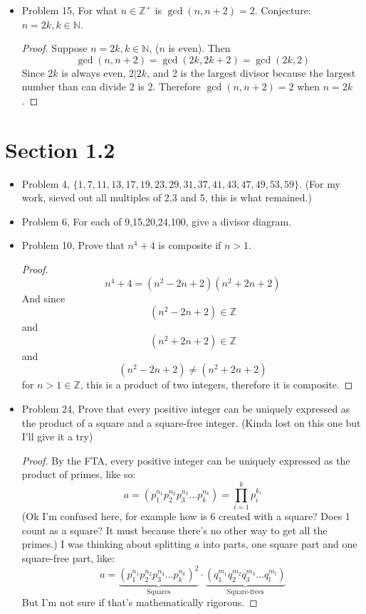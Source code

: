 \documentclass[hidelinks,12pt]{article}
\newcommand{\N}{\mathbb{N}}
\newcommand{\Z}{\mathbb{Z}}
\begin{document}
\begin{itemize}
\begin{proof}
If $n|a$ and $n|b$, then $a=np$, and $b=nq$. Then $a+b+c=np+nq+c=0$. So $c=-n(p+q)$, therefore $c$ is some multiple of $n$, thus $n|c$.
\end{proof}
\item Problem 15, For what $n\in\Z^+$ is $\gcd(n,n+2)=2$. Conjecture: $n=2k,k\in\N$.
\begin{proof}
Suppose $n=2k,k\in\N$, ($n$ is even). Then $$\gcd(n,n+2)=\gcd(2k,2k+2)=\gcd(2k,2)$$Since $2k$ is always even, $2|2k$, and 2 is the largest divisor because the largest number than can divide 2 is 2. Therefore $\gcd(n,n+2)=2$ when $n=2k$.
\end{proof}
\end{itemize}
\section{Section 1.2}
\begin{itemize}
    \item Problem 4, $\{1,7,11,13,17,19,23,29,31,37,41,43,47,49,53,59\}$. (For my work, sieved out all multiples of 2,3 and 5, this is what remained.)
    \item Problem 6, For each of 9,15,20,24,100, give a divisor diagram.\newline{}
    \item Problem 10, Prove that $n^4+4$ is composite if $n>1$.\begin{proof}
    $$n^4+4=(n^2-2n+2)(n^2+2n+2)$$And since $$(n^2-2n+2)\in\Z$$and $$(n^2+2n+2)\in\Z$$ and $$(n^2-2n+2)\neq(n^2+2n+2)$$ for $n>1\in\Z$, this is a product of two integers, therefore it is composite.
    \end{proof}
    \item Problem 24, Prove that every positive integer can be uniquely expressed as the product of a square and a square-free integer. (Kinda lost on this one but I'll give it a try)
    \begin{proof}
    By the FTA, every positive integer can be uniquely expressed as the product of primes, like so:$$a=(p_1^{n_1}p_2^{n_2}p_3^{n_3}...p_k^{n_k})=\prod_{i=1}^kp_i^{k_i}$$ (Ok I'm confused here, for example how is 6 created with a square? Does 1 count as a square? It must because there's no other way to get all the primes.) I was thinking about splitting $a$ into parts, one square part and one square-free part, like: $$a=\underbrace{(p_1^{n_1}p_2^{n_2}p_3^{n_3}...p_k^{n_k})^2}_{\text{Squares}}\cdot\underbrace{(q_1^{m_1}q_2^{m_2}q_3^{m_3}...q_l^{m_l})}_{\text{Square-frees}}$$But I'm not sure if that's mathematically rigorous.
    \end{proof}
\end{itemize}
\end{document}

